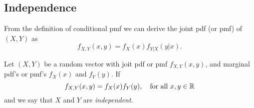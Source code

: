 \subsection{Independence}
From the definition of conditional pmf we can derive the joint pdf (or pmf) of $(X,Y)$ as 
$$
f_{X,Y}(x,y) = f_X(x)f_{Y|X}(y|x).
$$
\begin{definition}[Independent R.V's]
Let $(X,Y)$ be a random vector with joit pdf or pmf $f_{X,Y}(x,y)$, and marginal pdf's or pmf's $f_X(x)$ and $f_Y(y)$. If
$$
f_{X,Y}(x,y) = f_X(x)f_Y(y), \quad \text{for all } x,y \in \mathbb R
$$
and we say that $X$ and $Y$ are \textit{independent}.
\end{definition}


